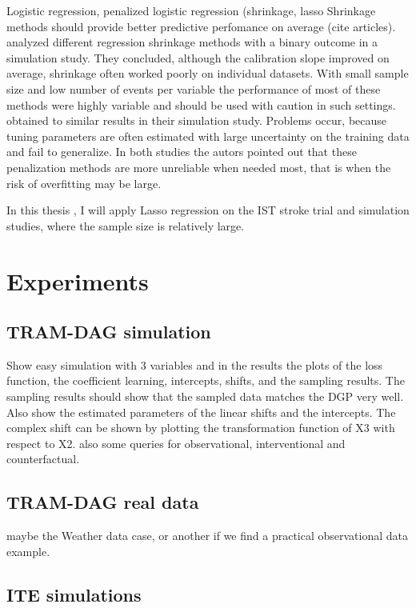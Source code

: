 Logistic regression, penalized logistic regression (shrinkage, lasso
Shrinkage methods should provide better predictive perfomance on average (cite articles). \citet{calster2020} analyzed different regression shrinkage methods with a binary outcome in a simulation study. They concluded, although the calibration slope improved on average, shrinkage often worked poorly on individual datasets. With small sample size and low number of events per variable the performance of most of these methods were highly variable and should be used with caution in such settings. \citet{riley2021} obtained to similar results in their simulation study. Problems occur, because tuning parameters are often estimated with large uncertainty on the training data and fail to generalize. In both studies the autors pointed out that these penalization methods are more unreliable when needed most, that is when the risk of overfitting may be large.

In this thesis , I will apply Lasso regression on the IST stroke trial and simulation studies, where the sample size is relatively large.

\section{Experiments}

\subsection{TRAM-DAG simulation}

Show easy simulation with 3 variables and in the results the plots of the loss function, the coefficient learning, intercepts, shifts, and the sampling results. The sampling results should show that the sampled data matches the DGP very well. Also show the estimated parameters of the linear shifts and the intercepts. The complex shift can be shown by plotting the transformation function of X3 with respect to X2. also some queries for observational, interventional and counterfactual.

\subsection{TRAM-DAG real data}

maybe the Weather data case, or another if we find a practical observational data example.

\subsection{ITE simulations}

